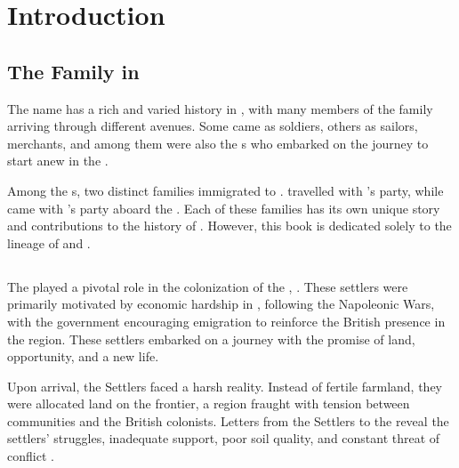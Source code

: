 \chapter{Introduction}
\label{introduction}

\section[The McDonald Family in South Africa]{The \mcdonald{} Family in \southAfrica}
\label{introduction: overview}

The \mcdonald{} name has a rich and varied history in \southAfrica{}, with many members of the \mcdonald{} family arriving through different avenues. Some came as soldiers, others as sailors, merchants, and among them were also the \settler s who embarked on the journey to start anew in the \capeColony{}.

Among the \settler s, two distinct \mcdonald{} families immigrated to \southAfrica{}. \mcdonaldPName{} travelled with \synnotWName{}'s party, while \mcdonaldJName{} came with \biggarAName’s party aboard the \weymouth{}. Each of these families has its own unique story and contributions to the history of \southAfrica{}. However, this book is dedicated solely to the lineage of \mcdonaldJName{} and \welchMName{}.

\section[British 1820 Settlers]{\settlersBritish{}}
\label{introduction: settlers}

The \settlersBritish{} played a pivotal role in the colonization of the \easternCape{}, \southAfrica{}. These settlers were primarily motivated by economic hardship in \britain{}, following the Napoleonic Wars, with the government encouraging emigration to reinforce the British presence in the region. These settlers embarked on a journey with the promise of land, opportunity, and a new life.

Upon arrival, the Settlers faced a harsh reality. Instead of fertile farmland, they were allocated land on the \easternCape{} frontier, a region fraught with tension between \xhosa{} communities and the British colonists. Letters from the Settlers to the \colonialOffice{} reveal the settlers' struggles, inadequate support, poor soil quality, and constant threat of conflict \autocite{eggsa:settlerStatement}.

